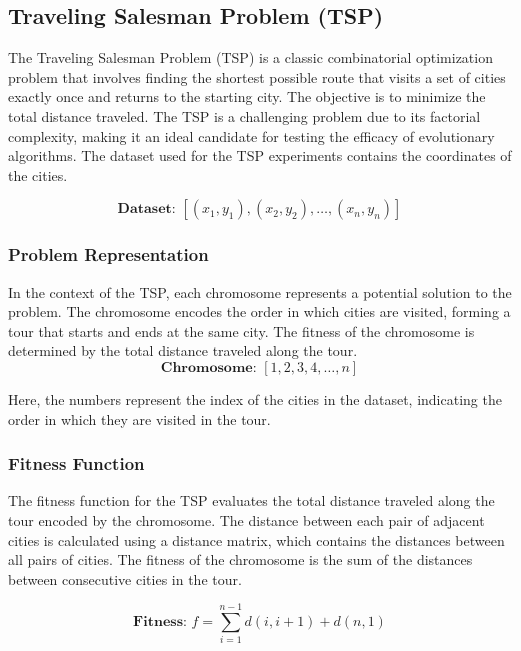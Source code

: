 \documentclass[conference]{IEEEtran}
\begin{document}
\subsection{Traveling Salesman Problem (TSP)}
The Traveling Salesman Problem (TSP) is a classic combinatorial optimization
problem that involves finding the shortest possible route that visits a set of
cities exactly once and returns to the starting city. The objective is to
minimize the total distance traveled. The TSP is a challenging problem due to
its factorial complexity, making it an ideal candidate for testing the efficacy
of evolutionary algorithms. The dataset used for the TSP experiments contains
the coordinates of the cities.

\begin{equation*}
    \textbf{Dataset: } [(x_1, y_1), (x_2, y_2), \dots, (x_n, y_n)]
\end{equation*}

\subsubsection{Problem Representation}
In the context of the TSP, each chromosome represents a potential solution to
the problem. The chromosome encodes the order in which cities are visited,
forming a tour that starts and ends at the same city. The fitness of the
chromosome is determined by the total distance traveled along the tour.
\begin{equation*}
    \textbf{Chromosome: } [1, 2, 3, 4, \dots, n]
\end{equation*}

Here, the numbers represent the index of the cities in the dataset, indicating
the order in which they are visited in the tour.

\subsubsection{Fitness Function}
The fitness function for the TSP evaluates the total distance traveled along
the tour encoded by the chromosome. The distance between each pair of adjacent
cities is calculated using a distance matrix, which contains the distances
between all pairs of cities. The fitness of the chromosome is the sum of the
distances between consecutive cities in the tour.

\begin{equation*}
    \textbf{Fitness: } f = \sum_{i=1}^{n-1} d(i, i+1) + d(n, 1)
\end{equation*}
\end{document}
